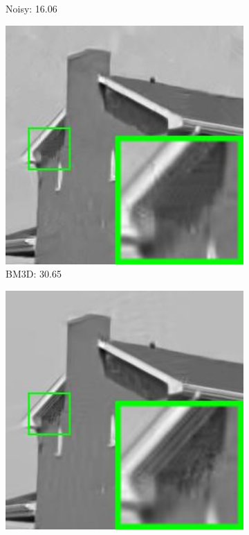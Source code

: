 \begin{figure}
\begin{subfigure}[t]{0.24\textwidth}
		\caption{Noisy: 16.06}
    \end{subfigure}
    \hfill
    \begin{subfigure}[t]{0.24\textwidth}
        \centering
        \includegraphics[width=1\textwidth]{images/pgpd/br_BM3D_40_house.jpg}
		\caption{BM3D: 30.65}
    \end{subfigure}
    \hfill
    \begin{subfigure}[t]{0.24\textwidth}
        \centering
        \includegraphics[width=1\textwidth]{images/pgpd/br_LSSC_40_house.jpg}

\end{subfigure}
\end{figure}
